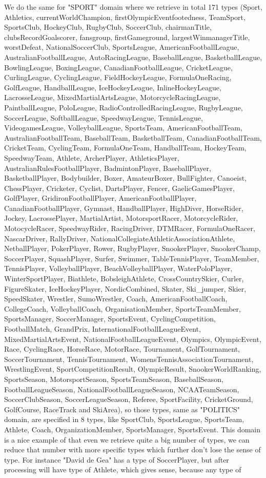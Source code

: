 \documentclass[thesis=M,english]{FITthesis}[2018/05/30]
\begin{document}
We do the same for "SPORT" domain where we retrieve in total 171 types (Sport, Athletics, currentWorldChampion, firstOlympicEventfootedness, TeamSport, SportsClub, HockeyClub, RugbyClub, SoccerClub, chairmanTitle, clubsRecordGoalscorer, fansgroup, firstGameground, largestWinmanagerTitle, worstDefeat, NationalSoccerClub, SportsLeague, AmericanFootballLeague, AustralianFootballLeague, AutoRacingLeague, BaseballLeague, BasketballLeague, BowlingLeague, BoxingLeague, CanadianFootballLeague, CricketLeague, CurlingLeague, CyclingLeague, FieldHockeyLeague, FormulaOneRacing, GolfLeague, HandballLeague, IceHockeyLeague, InlineHockeyLeague, LacrosseLeague, MixedMartialArtsLeague, MotorcycleRacingLeague, PaintballLeague, PoloLeague, RadioControlledRacingLeague, RugbyLeague, SoccerLeague, SoftballLeague, SpeedwayLeague, TennisLeague, VideogamesLeague, VolleyballLeague, SportsTeam, AmericanFootballTeam, AustralianFootballTeam, BaseballTeam, BasketballTeam, CanadianFootballTeam, CricketTeam, CyclingTeam, FormulaOneTeam, HandballTeam, HockeyTeam, SpeedwayTeam, Athlete, ArcherPlayer, AthleticsPlayer, AustralianRulesFootballPlayer, BadmintonPlayer, BaseballPlayer, BasketballPlayer, Bodybuilder, Boxer, AmateurBoxer, BullFighter, Canoeist, ChessPlayer, Cricketer, Cyclist, DartsPlayer, Fencer, GaelicGamesPlayer, GolfPlayer, GridironFootballPlayer, AmericanFootballPlayer, CanadianFootballPlayer, Gymnast, HandballPlayer, HighDiver, HorseRider, Jockey, LacrossePlayer, MartialArtist, MotorsportRacer, MotorcycleRider, MotocycleRacer, SpeedwayRider, RacingDriver, DTMRacer, FormulaOneRacer, NascarDriver, RallyDriver, NationalCollegiateAthleticAssociationAthlete, NetballPlayer, PokerPlayer, Rower, RugbyPlayer, SnookerPlayer, SnookerChamp, SoccerPlayer, SquashPlayer, Surfer, Swimmer, TableTennisPlayer, TeamMember, TennisPlayer, VolleyballPlayer, BeachVolleyballPlayer, WaterPoloPlayer, WinterSportPlayer, Biathlete, BobsleighAthlete, CrossCountrySkier, Curler, FigureSkater, IceHockeyPlayer, NordicCombined, Skater, Ski\_jumper, Skier, SpeedSkater, Wrestler, SumoWrestler, Coach, AmericanFootballCoach, CollegeCoach, VolleyballCoach, OrganisationMember, SportsTeamMember, SportsManager, SoccerManager, SportsEvent, CyclingCompetition, FootballMatch, GrandPrix, InternationalFootballLeagueEvent, MixedMartialArtsEvent, NationalFootballLeagueEvent, Olympics, OlympicEvent, Race, CyclingRace, HorseRace, MotorRace, Tournament, GolfTournament, SoccerTournament, TennisTournament, WomensTennisAssociationTournament, WrestlingEvent, SportCompetitionResult, OlympicResult, SnookerWorldRanking, SportsSeason, MotorsportSeason, SportsTeamSeason, BaseballSeason, FootballLeagueSeason, NationalFootballLeagueSeason, NCAATeamSeason, SoccerClubSeason, SoccerLeagueSeason, Referee, SportFacility, CricketGround, GolfCourse, RaceTrack and SkiArea), so those types, same as "POLITICS" domain, are specified in 8 types, like SportClub, SportsLeague, SportsTeam, Athlete, Coach, OrganizationMember, SportsManager, SportsEvent. This domain is a nice example of that even we retrieve quite a big number of types, we can reduce that number with more specific types which further don't lose the sense of type. For instance "David de Gea" has a type of SoccerPlayer, but after processing will have type of Athlete, which gives sense, because any type of 
\end{document}
